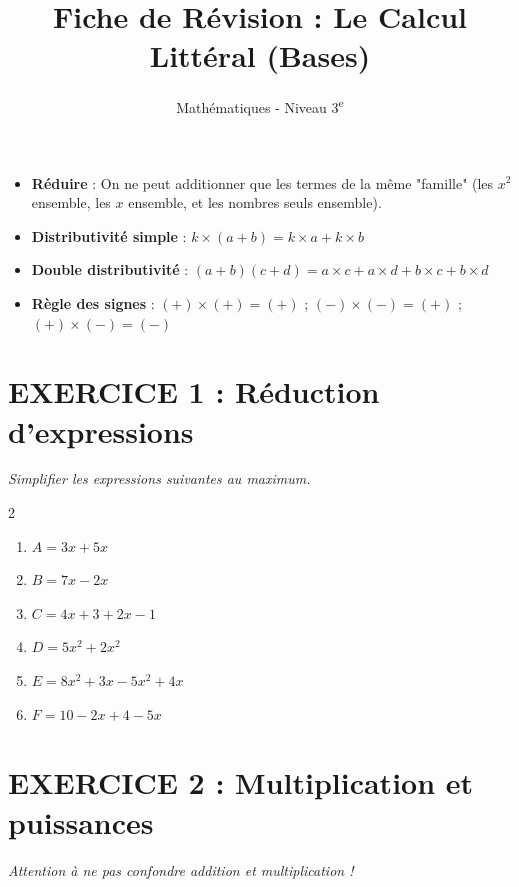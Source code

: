 \documentclass[11pt,a4paper]{article}
\title{\textbf{Fiche de Révision : Le Calcul Littéral (Bases)}}
\author{Mathématiques - Niveau 3\textsuperscript{e}}
\begin{document}
\maketitle

    \begin{tcolorbox}[colback=blue!5!white,colframe=blue!75!black,title=Rappels Importants]
    \begin{itemize}
        \item \textbf{Réduire} : On ne peut additionner que les termes de la même "famille" (les $x^2$ ensemble, les $x$ ensemble, et les nombres seuls ensemble).
        \item \textbf{Distributivité simple} : $k \times (a + b) = k \times a + k \times b$
        \item \textbf{Double distributivité} : $(a + b)(c + d) = a \times c + a \times d + b \times c + b \times d$
        \item \textbf{Règle des signes} : $(+) \times (+) = (+)$ ; $(-) \times (-) = (+)$ ; $(+) \times (-) = (-)$
    \end{itemize}
    \end{tcolorbox}
    
    \section*{EXERCICE 1 : Réduction d'expressions}
    \textit{Simplifier les expressions suivantes au maximum.}
    
    \begin{multicols}{2}
    \begin{enumerate}
        \item $A = 3x + 5x$
        \item $B = 7x - 2x$
        \item $C = 4x + 3 + 2x - 1$
        \item $D = 5x^2 + 2x^2$
        \item $E = 8x^2 + 3x - 5x^2 + 4x$
        \item $F = 10 - 2x + 4 - 5x$
    \end{enumerate}
    \end{multicols}
    
    \section*{EXERCICE 2 : Multiplication et puissances}
    \textit{Attention à ne pas confondre addition et multiplication !}
    
\end{document}
